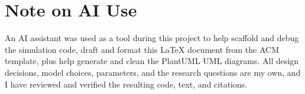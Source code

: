\documentclass[manuscript,nonacm,11pt]{acmart}
\begin{document}
\section{Note on AI Use}
An AI assistant was used as a tool during this project to help scaffold and debug the
simulation code, draft and format this \LaTeX{} document from the ACM template, plus help 
generate and clean the PlantUML UML diagrams. All design decisions, model choices, parameters, and the
research questions are my own, and I have reviewed and verified the resulting
code, text, and citations.



\end{document}
